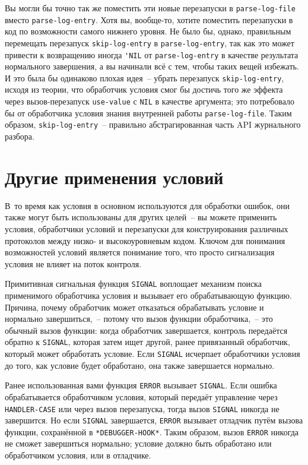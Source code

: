Вы могли бы точно так же поместить эти новые перезапуски в \lstinline{parse-log-file} вмес\-то
\lstinline{parse-log-entry}. Хотя вы, вообще-то, хотите поместить перезапуски в код
по возможности самого нижнего уровня. Не было бы, однако, правильным перемещать перезапуск
\lstinline{skip-log-entry} в \lstinline{parse-log-entry}, так как это может привести к возвращению
иногда \lstinline{'NIL} от \lstinline{parse-log-entry} в качестве результата нормального завершения,
а вы начинали всё с тем, чтобы таких вещей избежать. И это была бы одинаково плохая идея~--
убрать перезапуск \lstinline{skip-log-entry}, исходя из теории, что обработчик условия смог бы
достичь того же эффекта через вызов-перезапуск \lstinline{use-value} с \lstinline{NIL} в качестве
аргумента; это потребовало бы от обработчика условия знания внутренней работы
\lstinline{parse-log-file}. Таким образом, \lstinline{skip-log-entry}~-- правильно абстрагированная
часть API журнального разбора.

\section{Другие применения условий}
\label{ch19:other-appls}

В~то время как условия в основном используются для обработки ошибок, они также могут быть
использованы для других целей~-- вы можете применить условия, обработчики условий и
перезапуски для конструирования различных протоколов между низко- и высокоуровневым
кодом. Ключом для понимания возможностей условий является понимание того, что просто
сигнализация условия не влияет на поток контроля.

Примитивная сигнальная функция \lstinline{SIGNAL} воплощает механизм поиска применимого
обработчика условия и вызывает его обрабатывающую функцию. Причина, почему обработчик
может отказаться обрабатывать условие и нормально завершиться,~-- потому что вызов
функции обработчика,~-- это обычный вызов функции: когда обработчик завершается, контроль
передаётся обратно к \lstinline{SIGNAL}, которая затем ищет другой, ранее привязанный
обработчик, который может обработать условие. Если \lstinline{SIGNAL} исчерпает обработчики
условия до того, как условие будет обработано, она также завершается нормально.

Ранее использованная вами функция \lstinline{ERROR} вызывает \lstinline{SIGNAL}. Если ошибка
обрабатывается обработчиком условия, который передаёт управление через \lstinline{HANDLER-CASE}
или через вызов перезапуска, тогда вызов \lstinline{SIGNAL} никогда не завершится. Но если
\lstinline{SIGNAL} завершается, \lstinline{ERROR} вызывает отладчик путём вызова функции,
сохранённой в \lstinline{*DEBUGGER-HOOK*}. Таким образом, вызов \lstinline{ERROR} никогда не сможет
завершиться нормально; условие должно быть обработано или обработчиком условия, или в
отладчике.


